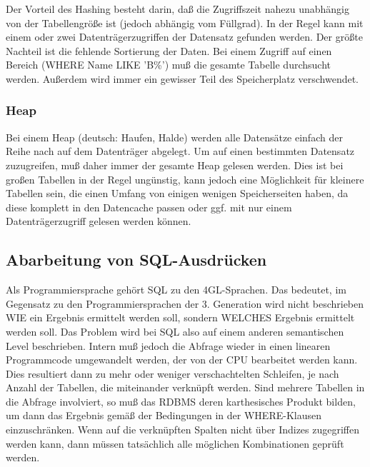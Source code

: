 Der Vorteil des Hashing besteht darin, daß die Zugriffszeit nahezu unabhängig von der Tabellengröße ist (jedoch abhängig vom Füllgrad). In der Regel kann mit einem oder zwei Datenträgerzugriffen der Datensatz gefunden werden.
Der größte Nachteil ist die fehlende Sortierung der Daten. Bei einem Zugriff auf einen Bereich (WHERE Name LIKE 'B\%') muß die gesamte Tabelle durchsucht werden. Außerdem wird immer ein gewisser Teil des Speicherplatz verschwendet.

\subsubsection{Heap} 
Bei einem Heap (deutsch: Haufen, Halde) werden alle Datensätze einfach der Reihe nach auf dem Datenträger abgelegt. Um auf einen bestimmten Datensatz zuzugreifen, muß daher immer der gesamte Heap gelesen werden. Dies ist bei großen Tabellen in der Regel ungünstig, kann jedoch eine Möglichkeit für kleinere Tabellen sein, die einen Umfang von einigen wenigen Speicherseiten haben, da diese komplett in den Datencache passen oder ggf. mit nur einem Datenträgerzugriff gelesen werden können.

\subsection{Abarbeitung von SQL-Ausdrücken}
Als Programmiersprache gehört SQL zu den 4GL-Sprachen. Das bedeutet, im Gegensatz zu den Programmiersprachen der 3. Generation wird nicht beschrieben WIE ein Ergebnis ermittelt werden soll, sondern WELCHES Ergebnis ermittelt werden soll. Das Problem wird bei SQL also auf einem anderen semantischen Level beschrieben. Intern muß jedoch die Abfrage wieder in einen linearen Programmcode umgewandelt werden, der von der CPU bearbeitet werden kann. Dies resultiert dann zu mehr oder weniger verschachtelten Schleifen, je nach Anzahl der Tabellen, die miteinander verknüpft werden.
Sind mehrere Tabellen in die Abfrage involviert, so muß das RDBMS deren karthesisches Produkt bilden, um dann das Ergebnis gemäß der Bedingungen in der WHERE-Klausen einzuschränken. Wenn auf die verknüpften Spalten nicht über Indizes zugegriffen werden kann, dann müssen tatsächlich alle möglichen Kombinationen geprüft werden.

